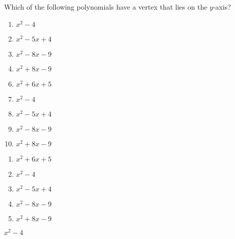 


 Which of the following polynomials have a vertex that lies on the $y$-axis?


\ifsat
	\begin{enumerate}[label=\Alph*)]
		\item  $x^{2}-4$%
		\item  $x^{2}-5x+4$
		\item  $x^{2}-8x-9$
		\item  $x^{2}+8x-9$
	\end{enumerate}
\else
\fi

\ifacteven
	\begin{enumerate}[label=\textbf{\Alph*.},itemsep=\fill,align=left]
		\setcounter{enumii}{5}
		\item  $x^{2}+6x+5$
		\item  $x^{2}-4$%
		\item  $x^{2}-5x+4$
		\addtocounter{enumii}{1}
		\item  $x^{2}-8x-9$
		\item  $x^{2}+8x-9$
	\end{enumerate}
\else
\fi

\ifactodd
	\begin{enumerate}[label=\textbf{\Alph*.},itemsep=\fill,align=left]
		\item  $x^{2}+6x+5$
		\item  $x^{2}-4$%
		\item  $x^{2}-5x+4$
		\item  $x^{2}-8x-9$
		\item  $x^{2}+8x-9$
	\end{enumerate}
\else
\fi

\ifgridin
  $x^{2}-4$%
		
\else
\fi

